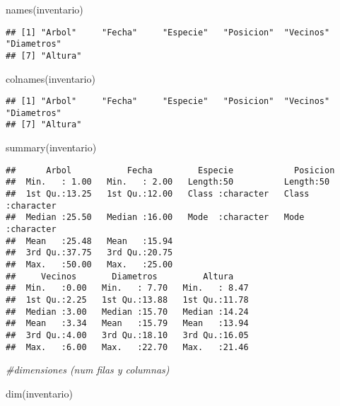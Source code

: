 \documentclass[
]{article}
\newenvironment{Shaded}{\begin{snugshade}}{\end{snugshade}}
\newcommand{\CommentTok}[1]{\textcolor[rgb]{0.56,0.35,0.01}{\textit{#1}}}
\newcommand{\FunctionTok}[1]{\textcolor[rgb]{0.00,0.00,0.00}{#1}}
\newcommand{\NormalTok}[1]{#1}
\begin{document}
\begin{Shaded}
\begin{Highlighting}[]
\FunctionTok{names}\NormalTok{(inventario)}
\end{Highlighting}
\end{Shaded}

\begin{verbatim}
## [1] "Arbol"     "Fecha"     "Especie"   "Posicion"  "Vecinos"   "Diametros"
## [7] "Altura"
\end{verbatim}

\begin{Shaded}
\begin{Highlighting}[]
\FunctionTok{colnames}\NormalTok{(inventario)}
\end{Highlighting}
\end{Shaded}

\begin{verbatim}
## [1] "Arbol"     "Fecha"     "Especie"   "Posicion"  "Vecinos"   "Diametros"
## [7] "Altura"
\end{verbatim}

\begin{Shaded}
\begin{Highlighting}[]
\FunctionTok{summary}\NormalTok{(inventario)}
\end{Highlighting}
\end{Shaded}

\begin{verbatim}
##      Arbol           Fecha         Especie            Posicion        
##  Min.   : 1.00   Min.   : 2.00   Length:50          Length:50         
##  1st Qu.:13.25   1st Qu.:12.00   Class :character   Class :character  
##  Median :25.50   Median :16.00   Mode  :character   Mode  :character  
##  Mean   :25.48   Mean   :15.94                                        
##  3rd Qu.:37.75   3rd Qu.:20.75                                        
##  Max.   :50.00   Max.   :25.00                                        
##     Vecinos       Diametros         Altura     
##  Min.   :0.00   Min.   : 7.70   Min.   : 8.47  
##  1st Qu.:2.25   1st Qu.:13.88   1st Qu.:11.78  
##  Median :3.00   Median :15.70   Median :14.24  
##  Mean   :3.34   Mean   :15.79   Mean   :13.94  
##  3rd Qu.:4.00   3rd Qu.:18.10   3rd Qu.:16.05  
##  Max.   :6.00   Max.   :22.70   Max.   :21.46
\end{verbatim}

\begin{Shaded}
\begin{Highlighting}[]
\CommentTok{\#dimensiones (num filas y columnas)}

\FunctionTok{dim}\NormalTok{(inventario)}
\end{Highlighting}
\end{Shaded}
\end{document}
